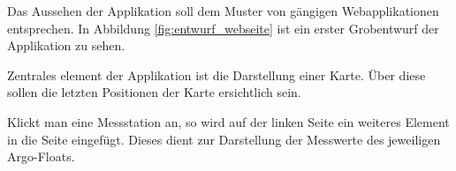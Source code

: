 Das Aussehen der Applikation soll dem Muster von gängigen Webapplikationen entsprechen. In Abbildung \ref{fig:entwurf_webseite} ist ein erster Grobentwurf der Applikation zu sehen.

Zentrales element der Applikation ist die Darstellung einer Karte. Über diese sollen die letzten Positionen der Karte ersichtlich sein.


Klickt man eine Messstation an, so wird auf der linken Seite ein weiteres Element in die Seite eingefügt. Dieses dient zur Darstellung der Messwerte des jeweiligen Argo-Floats.





